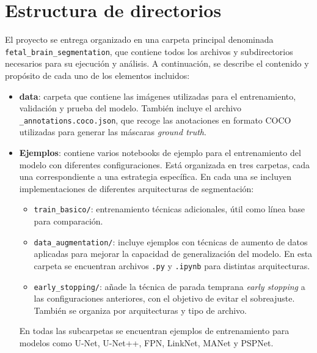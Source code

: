 
\section{Estructura de directorios}

El proyecto se entrega organizado en una carpeta principal denominada \texttt{fetal\_brain\_segmentation}, que contiene todos los archivos y subdirectorios necesarios para su ejecución y análisis. A continuación, se describe el contenido y propósito de cada uno de los elementos incluidos:

\begin{itemize}
    \item \textbf{data}: carpeta que contiene las imágenes utilizadas para el entrenamiento, validación y prueba del modelo. También incluye el archivo \texttt{\_annotations.coco.json}, que recoge las anotaciones en formato COCO utilizadas para generar las máscaras \textit{ground truth}.
    \item \textbf{Ejemplos}: contiene varios notebooks de ejemplo para el entrenamiento del modelo con diferentes configuraciones. Está organizada en tres carpetas, cada una correspondiente a una estrategia específica. En cada una se incluyen implementaciones de diferentes arquitecturas de segmentación:
    \begin{itemize}
        \item \texttt{train\_basico/}: entrenamiento técnicas adicionales, útil como línea base para comparación.
        \item \texttt{data\_augmentation/}: incluye ejemplos con técnicas de aumento de datos aplicadas para mejorar la capacidad de generalización del modelo. En esta carpeta se encuentran archivos \texttt{.py} y \texttt{.ipynb} para distintas arquitecturas.
        \item \texttt{early\_stopping/}: añade la técnica de parada temprana \textit{early stopping} a las configuraciones anteriores, con el objetivo de evitar el sobreajuste. También se organiza por arquitecturas y tipo de archivo.
    \end{itemize}
    En todas las subcarpetas se encuentran ejemplos de entrenamiento para modelos como U-Net, U-Net++, FPN, LinkNet, MANet y PSPNet.
    

\end{itemize}
